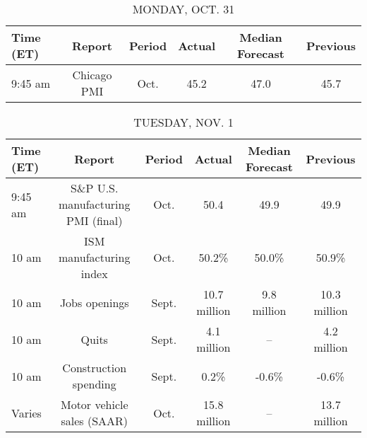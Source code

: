 \documentclass{article}%
\begin{document}
%
\normalsize%


\begin{table}[htbp]%
\caption{MONDAY, OCT. 31}%
\centering%
\begin{adjustbox}{width=1\textwidth}%
\begin{tabular}{lccccc}
\toprule
Time (ET) &      Report & Period & Actual & Median Forecast & Previous \\
\midrule
  9:45 am & Chicago PMI &   Oct. &   45.2 &            47.0 &     45.7 \\
\bottomrule
\end{tabular}
%
\end{adjustbox}%
\end{table}

%


\begin{table}[htbp]%
\caption{TUESDAY, NOV. 1}%
\centering%
\begin{adjustbox}{width=1\textwidth}%
\begin{tabular}{lccccc}
\toprule
Time (ET) &                             Report & Period &       Actual & Median Forecast &     Previous \\
\midrule
  9:45 am & S\&P U.S. manufacturing PMI (final) &   Oct. &         50.4 &            49.9 &         49.9 \\
    10 am &            ISM manufacturing index &   Oct. &        50.2\% &           50.0\% &        50.9\% \\
    10 am &                      Jobs openings &  Sept. & 10.7 million &     9.8 million & 10.3 million \\
    10 am &                              Quits &  Sept. &  4.1 million &              -- &  4.2 million \\
    10 am &              Construction spending &  Sept. &         0.2\% &           -0.6\% &        -0.6\% \\
   Varies &         Motor vehicle sales (SAAR) &   Oct. & 15.8 million &              -- & 13.7 million \\
\bottomrule
\end{tabular}
%
\end{adjustbox}%
\end{table}

%
\end{document}
